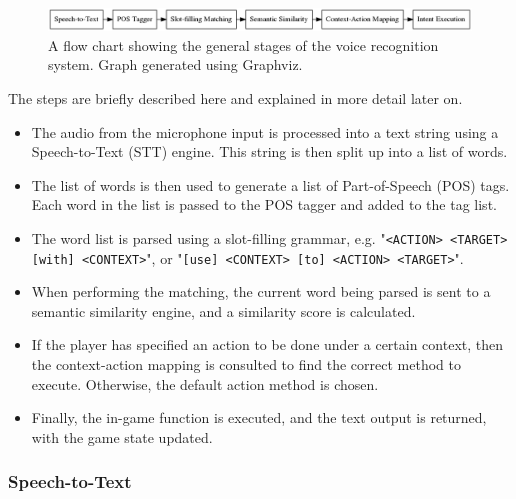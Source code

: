 \documentclass[12pt]{article}
\begin{document}
\begin{center}
\begin{figure}[H]
\begin{center}
  \includegraphics[width=\linewidth]{flow-chart.png}
  \caption{A flow chart showing the general stages of the voice recognition system. Graph generated using Graphviz.}
  \label{fig:flow-chart}
  \end{center}
\end{figure}
\end{center}

The steps are briefly described here and explained in more detail later on.

\begin{itemize}
\item The audio from the microphone input is processed into a text string using a Speech-to-Text (STT) engine. This string is then split up into a list of words.

\item The list of words is then used to generate a list of Part-of-Speech (POS) tags. Each word in the list is passed to the POS tagger and added to the tag list.

\item The word list is parsed using a slot-filling grammar, e.g. "\texttt{<ACTION> <TARGET> [with] <CONTEXT>}", or "\texttt{[use] <CONTEXT> [to] <ACTION> <TARGET>}".

\item When performing the matching, the current word being parsed is sent to a semantic similarity engine, and a similarity score is calculated.

\item If the player has specified an action to be done under a certain context, then the context-action mapping is consulted to find the correct method to execute. Otherwise, the default action method is chosen.

\item Finally, the in-game function is executed, and the text output is returned, with the game state updated.
\end{itemize}

\subsubsection{Speech-to-Text}
\end{document}
